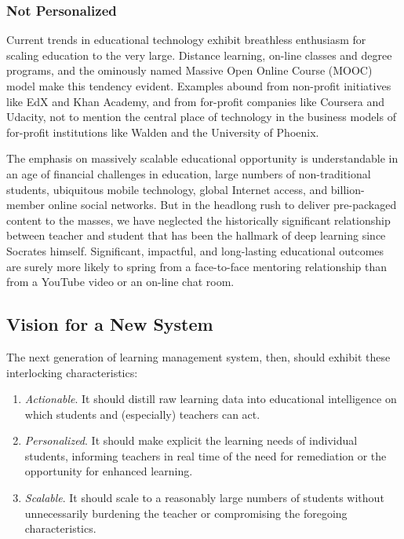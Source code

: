 \documentclass{article}
\begin{document}
\subsubsection{Not Personalized}

Current trends in educational technology
exhibit breathless enthusiasm for scaling education
to the very large.
Distance learning,
on-line classes and degree programs,
and the ominously named Massive Open Online Course (MOOC) model
make this tendency evident.
Examples abound
from non-profit initiatives like EdX and Khan Academy,
and from for-profit companies like Coursera and Udacity,
not to mention the central place of technology in the business models of
for-profit institutions like Walden and the University of Phoenix.

The emphasis on massively scalable educational opportunity
is understandable in an age of
financial challenges in education,
large numbers of non-tradi\-tional students,
ubiquitous mobile tech\-nology,
global Internet access,
and billion-member online social networks.
But in the headlong rush to deliver pre-packaged content to the masses,
we have neglected the historically significant relationship
between teacher and student that has been the hallmark
of deep learning since Socrates himself.
Significant, impactful, and long-lasting educational
outcomes are surely more likely to spring
from a face-to-face mentoring relationship than
from a YouTube video or an on-line chat room.

\subsection{Vision for a New System}
\label{sec:future-vision}

The next generation of learning management system, then,
should exhibit these interlocking characteristics:
\begin{enumerate}
\item \emph{Actionable}. It should distill raw learning data
  into educational intelligence on which students
  and (especially) teachers can act.
\item \emph{Personalized}. It should make explicit
  the learning needs of individual students,
  informing teachers in real time of the need for remediation
  or the opportunity for enhanced learning.
\item \emph{Scalable}. It should scale to a reasonably large numbers of students
  without unnecessarily burdening the teacher
  or compromising the foregoing characteristics.
\end{enumerate}
\end{document}
